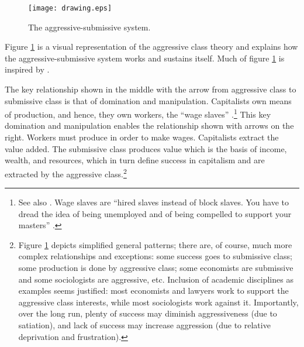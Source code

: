 \documentclass[11pt, letterpaper]{article}
\begin{document}
\begin{spacing}{2.0}



\begin{figure}[H]
 \texttt{[image: drawing.eps]}\centering
\caption{The aggressive-submissive system.}\label{drawing}
\end{figure}

 
Figure \ref{drawing} is a visual representation of the aggressive class theory and explains how the
aggressive-submissive system works and sustains itself.
 Much of figure \ref{drawing} is inspired by \cite{marx10}. %

The key relationship shown in the middle with the arrow from aggressive class to
submissive class is that of domination and manipulation. %
Capitalists own means of production, and hence, they own workers, the ``wage slaves'' \citep{marx10}.\footnote{See also
\citet{goldman03,stefanSS10may}. Wage slaves are ``hired slaves instead of block
slaves. You have to dread the idea of being unemployed and of being compelled to
support your masters'' \citep[p. 283][]{goldman03}.} This key domination and
manipulation enables the relationship shown with arrows on the right. 
 Workers must produce in order to make wages. Capitalists extract the value added.
 The submissive class produces value which is the basis of income, wealth, and
 resources, which in turn define success in capitalism and are extracted by the
 aggressive class.\footnote{Figure \ref{drawing} depicts
  simplified general patterns; there are, of course, much more complex
  relationships and exceptions: some success goes to submissive class; some
  production is done by aggressive class; some economists are submissive and some
 sociologists are aggressive, etc. Inclusion of academic disciplines as examples seems
justified: most economists and lawyers work to support the aggressive class
interests, while most sociologists work against it.
Importantly, over the long run, plenty of success
may diminish aggressiveness (due to satiation), and lack of success may increase
aggression (due to relative deprivation and frustration).}



\end{spacing}
\end{document}
